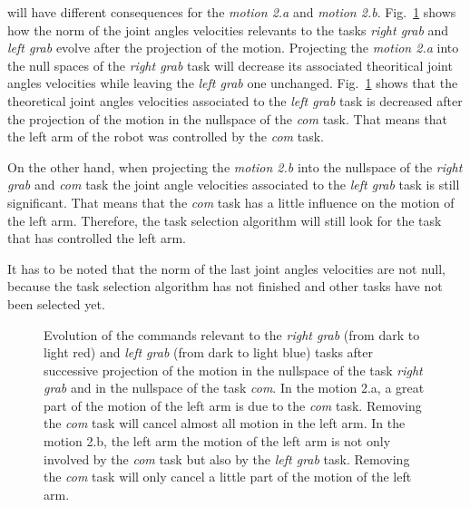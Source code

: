 \documentclass[letterpaper, 10pt, conference]{ieeeconf}      %
\begin{document}
will have different consequences for the \emph{motion 2.a} and \emph{motion 2.b}.
Fig.~\ref{fig:RbeforeAfterProj} shows how the norm of the joint angles velocities relevants to the tasks
\emph{right grab} and \emph{left grab} evolve after the projection of the motion.
Projecting the \emph{motion 2.a} into the null spaces of
the \emph{right grab} task will decrease its associated theoritical joint angles velocities while leaving the
\emph{left grab} one unchanged. Fig.~\ref{fig:RbeforeAfterProj} shows
that the theoretical joint angles velocities associated to the
\emph{left grab} task is decreased after the projection of the motion in
the nullspace of the \emph{com} task.  That means that
the left arm of the robot was controlled by the \emph{com} task.

On the other hand, when projecting the \emph{motion 2.b} into the nullspace of the \emph{right grab}
and \emph{com} task the joint angle velocities associated to the \emph{left grab} task
is still significant. That means that the \emph{com} task has a little influence on the
motion of the left arm. Therefore, the task selection algorithm will still look
for the task that has controlled the left arm.

It has to be noted that the norm of the last joint angles velocities are not null, because 
the task selection algorithm has not finished and other tasks have not been selected yet.
\begin{figure}[t]
\centering
  \subfigure[Motion 2.a]{
  \resizebox{.48\textwidth}{!} {
      
    }
  \label{fig:RbeforeAfterProj:2a}
  }
  \subfigure[Motion 2.b]{
  \resizebox{.48\textwidth}{!} {
      
  }
  \label{fig:RbeforeAfterProj:2b}
  }
  \caption{Evolution of the commands relevant to the \emph{right grab} (from dark to light red) and 
  \emph{left grab} (from dark to light blue) tasks after
  successive projection of the motion in the nullspace of the task \emph{right grab} and in the nullspace
  of the task \emph{com}. In the motion 2.a, a great part of the motion of the left arm is due to the \emph{com} task.
  Removing the \emph{com} task will cancel almost all motion in the left arm.
  In the motion 2.b, the left arm the motion of the left arm is not only involved by the \emph{com} task
  but also by the \emph{left grab} task. Removing the \emph{com} task will only
  cancel a little part of the motion of the left arm.}
\label{fig:RbeforeAfterProj}
\end{figure}
\end{document}

